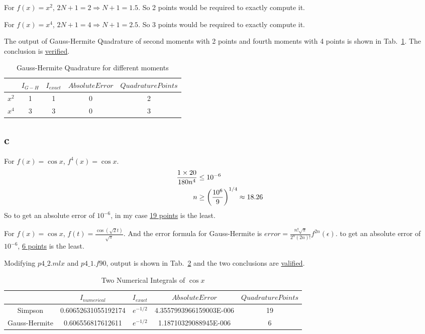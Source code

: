 \documentclass[letterpaper,10pt]{article}
\begin{document}
For $f\left(x\right)=x^2$, $2N+1=2 \Rightarrow N+1=1.5$. So 2 points would be required to exactly compute it. 

For $f\left(x\right)=x^4$, $2N+1=4 \Rightarrow N+1=2.5$. So 3 points would be required to exactly compute it. 

The output of Gauss-Hermite Quadrature of second moments with 2 points and fourth moments with 4 points is shown in Tab.~\ref{tab4_2}. 
The conclusion is \underline{verified}. 
\begin{table}[htbp]
  \centering  
  \caption{Gauss-Hermite Quadrature for different moments}\label{tab4_2}
  \begin{tabular}{ccccc}
    \hline
    & $I_{G-H}$ & $I_{exact}$ & $Absolute Error$ & $Quadrature Points$\\
    \hline
    $x^2$ & 1 & 1 & 0 & 2\\
    $x^4$ & 3 & 3 & 0 & 3\\
    \hline
  \end{tabular}
\end{table}

\subsection{c}
For $f\left(x\right) = \cos x$, $f^{4}\left(x\right) = \cos x$. 
\begin{align}
  \frac{1\times 20}{180n^4} &\leq 10^{-6}\notag\\
  n &\geq \left(\frac{10^6}{9}\right)^{1/4} \approx 18.26
\end{align}
So to get an absolute error of $10^{-6}$, in my case \underline{19 points} is the least.

For $f\left(x\right) = \cos x$, $f\left(t\right) = \frac{\cos \left(\sqrt{2}t\right)}{\sqrt{\pi}}$. 
And the error formula for Gauss-Hermite is $error = \frac{n!\sqrt{\pi}}{2^n\left(2n\right)!}f^{2n}\left(\epsilon\right)$. 
to get an absolute error of $10^{-6}$, \underline{6 points} is the least. 

Modifying $p4\_2.mlx$ and $p4\_1.f90$, output is shown in Tab.~\ref{tab4_3} and the two conclusions are \underline{valified}. 
\begin{table}[htbp]
  \centering  
  \caption{Two Numerical Integrals of $\cos x$}\label{tab4_3}
  \begin{tabular}{ccccc}
    \hline
    & $I_{numerical}$ & $I_{exact}$ & $Absolute Error$ & $Quadrature Points$\\
    \hline
    Simpson & 0.60652631055192174 & $e^{-1/2}$ & 4.3557993966159003E-006 & 19\\
    Gauss-Hermite & 0.606556817612611 & $e^{-1/2}$ & 1.18710329088945E-006 & 6\\
    \hline
  \end{tabular}
\end{table}
\end{document}
